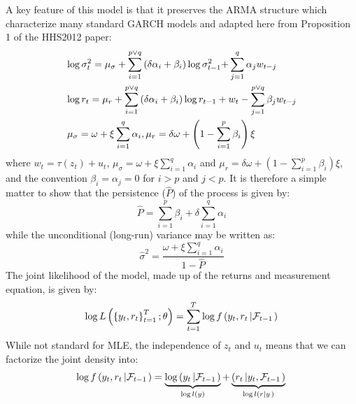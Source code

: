 A key feature of this model is that it preserves the ARMA structure which characterize many standard GARCH models and adapted here from Proposition 1 of the HHS2012 paper:
\begin{equation}
\begin{gathered}
  \log \sigma _t^2 = {\mu _\sigma } + \sum\limits_{i = 1}^{p \vee q} {\left( {\delta {\alpha _i} + {\beta _i}} \right)\log \sigma _{t - 1}^2 + } \sum\limits_{j = 1}^q {{\alpha _j}{w_{t - j}}}  \hfill \\
  \log {r_t} = {\mu _r} + \sum\limits_{i = 1}^{p \vee q} {\left( {\delta {\alpha _i} + {\beta _i}} \right)\log {r_{t - 1}} + {w_t}}  - \sum\limits_{j = 1}^{p \vee q} {{\beta _j}{w_{t - j}}}  \hfill \\
  {\mu _\sigma } = \omega  + \xi \sum\limits_{i = 1}^q {{\alpha _i}} ,{\mu _r} = \delta \omega  + \left( {1 - \sum\limits_{i = 1}^p {{\beta _i}} } \right)\xi  \hfill \\
\end{gathered}
\end{equation}
where $w_t=\tau\left(z_t\right)+u_t$, ${\mu _\sigma } = \omega  + \xi \sum\limits_{i = 1}^q {{\alpha _i}}$ and ${\mu _r} = \delta \omega  + \left( {1 - \sum\limits_{i = 1}^p {{\beta _i}} } \right)\xi$, and the convention ${\beta _i} = {\alpha _j} = 0$ for $i>p$ and $j<p$. It is therefore a simple matter to show that the persistence ($\hat P$) of the process is given by:
\begin{equation}
\hat P = \sum\limits_{i = 1}^p {{\beta _i} + } \delta \sum\limits_{i = 1}^q {{\alpha _i}}
\end{equation}
while the unconditional (long-run) variance may be written as:
\begin{equation}
{\hat \sigma ^2} = \frac{{\omega  + \xi \sum\limits_{i = 1}^q {{\alpha _i}} }}
{{1 - \hat P}}
\end{equation}
The joint likelihood of the model, made up of the returns and measurement equation, is given by:
\begin{equation}
  \log L\left( {\left\{ {{y_t},{r_t}} \right\}_{t = 1}^T;\theta } \right) = \sum\limits_{t = 1}^T {\log f\left( {{y_t},{r_t}\left| {\mathcal{F}_{t - 1}} \right.} \right)}  \hfill \\
\end{equation}
While not standard for MLE, the independence of $z_t$ and $u_t$ means that we can factorize the joint density into:
\begin{equation}
\log f\left( {{y_t},{r_t}\left| {\mathcal{F}_{t - 1}} \right.} \right) = \underbrace {\log \left( {{y_t}\left| {\mathcal{F}_{t - 1}} \right.} \right)}_{\log l\left( y \right)} + \underbrace {\left( {{r_t}\left| {{y_t},\mathcal{F}_{t - 1}} \right.} \right)}_{\log l\left( {r\left| y \right.} \right)} \hfill \\
\end{equation}
